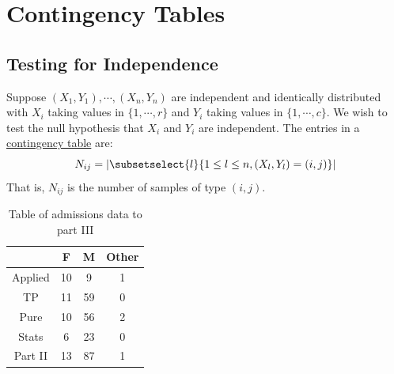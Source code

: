 \documentclass[../Main.tex]{subfiles}
\begin{document}
\section{Contingency Tables}
\subsection{Testing for Independence}
Suppose $(X_1, Y_1), \cdots, (X_n, Y_n)$ are independent and identically distributed with $X_i$ taking values in $\{1, \cdots, r\}$ and $Y_i$ taking values in $\{1, \cdots, c\}$. We wish to test the null hypothesis that $X_i$ and $Y_i$ are independent. The entries in a \underline{contingency table} are:
\begin{equation*}
    N_{ij} = \left|\subsetselect{l}{1 \leq l \leq n, (X_l, Y_l) = (i, j)}\right|
\end{equation*}
That is, $N_{ij}$ is the number of samples of type $(i, j)$.
\begin{table}
    \centering
    \begin{tabular}{|c|c|c|c|}
        \hline
         & F & M & Other \\
        \hline
        Applied & 10 & 9 & 1 \\
        TP & 11 & 59 & 0 \\
        Pure & 10 & 56 & 2 \\
        Stats & 6 & 23 & 0 \\
        Part II & 13 & 87 & 1 \\
        \hline
    \end{tabular}
    \caption{Table of admissions data to part III}
    \label{tabAdmissions}
\end{table}
\end{document}

